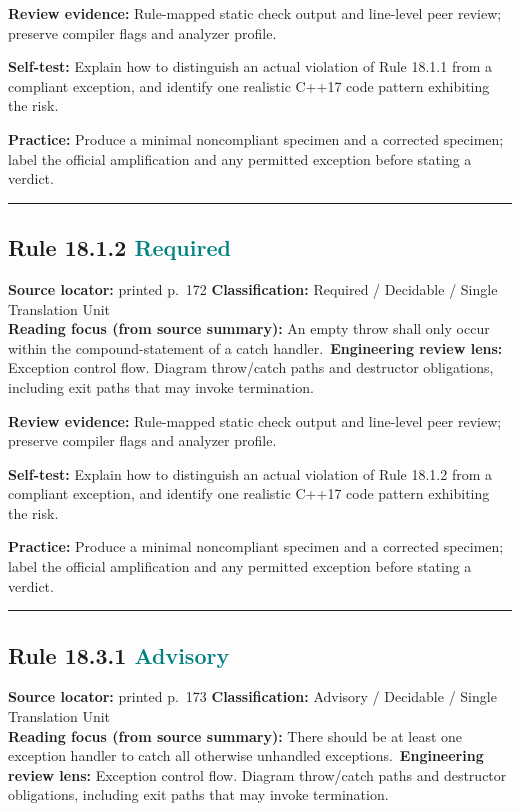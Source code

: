 \documentclass[10pt,letterpaper]{article}
\begin{document}
\textbf{Review evidence:} Rule-mapped static check output and line-level peer review; preserve compiler flags and analyzer profile.

\textbf{Self-test:} Explain how to distinguish an actual violation of Rule 18.1.1 from a compliant exception, and identify one realistic C++17 code pattern exhibiting the risk.\par
\textbf{Practice:} Produce a minimal noncompliant specimen and a corrected specimen; label the official amplification and any permitted exception before stating a verdict.
\smallskip\hrule\smallskip
\subsection*{Rule 18.1.2 \enspace \texorpdfstring{\small\textcolor{teal}{Required}}{Required}}
\noindent\textbf{Source locator:} printed p.~172 \quad\textbf{Classification:} Required / Decidable / Single Translation Unit\\
\textbf{Reading focus (from source summary):} An empty throw shall only occur within the compound-statement of a catch handler.\
\textbf{Engineering review lens:} Exception control flow. Diagram throw/catch paths and destructor obligations, including exit paths that may invoke termination.

\textbf{Review evidence:} Rule-mapped static check output and line-level peer review; preserve compiler flags and analyzer profile.

\textbf{Self-test:} Explain how to distinguish an actual violation of Rule 18.1.2 from a compliant exception, and identify one realistic C++17 code pattern exhibiting the risk.\par
\textbf{Practice:} Produce a minimal noncompliant specimen and a corrected specimen; label the official amplification and any permitted exception before stating a verdict.
\smallskip\hrule\smallskip
\subsection*{Rule 18.3.1 \enspace \texorpdfstring{\small\textcolor{teal}{Advisory}}{Advisory}}
\noindent\textbf{Source locator:} printed p.~173 \quad\textbf{Classification:} Advisory / Decidable / Single Translation Unit\\
\textbf{Reading focus (from source summary):} There should be at least one exception handler to catch all otherwise unhandled exceptions.\
\textbf{Engineering review lens:} Exception control flow. Diagram throw/catch paths and destructor obligations, including exit paths that may invoke termination.
\end{document}
